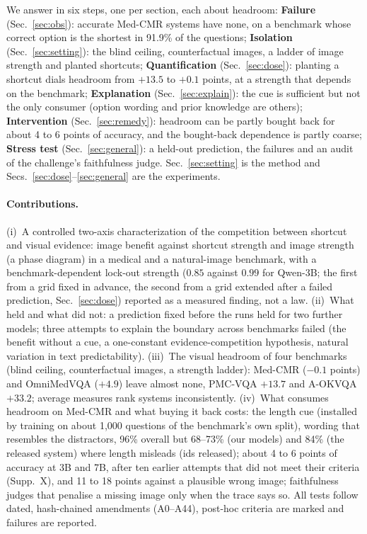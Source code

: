 We answer in six steps, one per section, each about headroom: \textbf{Failure} (Sec.~\ref{sec:obs}): accurate Med-CMR systems have none, on a benchmark whose correct option is the shortest in 91.9\% of the questions; \textbf{Isolation} (Sec.~\ref{sec:setting}): the blind ceiling, counterfactual images, a ladder of image strength and planted shortcuts; \textbf{Quantification} (Sec.~\ref{sec:dose}): planting a shortcut dials headroom from $+13.5$ to $+0.1$ points, at a strength that depends on the benchmark; \textbf{Explanation} (Sec.~\ref{sec:explain}): the cue is sufficient but not the only consumer (option wording and prior knowledge are others); \textbf{Intervention} (Sec.~\ref{sec:remedy}): headroom can be partly bought back for about 4 to 6 points of accuracy, and the bought-back dependence is partly coarse; \textbf{Stress test} (Sec.~\ref{sec:general}): a held-out prediction, the failures and an audit of the challenge's faithfulness judge.
Sec.~\ref{sec:setting} is the method and Secs.~\ref{sec:dose}--\ref{sec:general} are the experiments.

\paragraph{Contributions.}
(i)~A controlled two-axis characterization of the competition between shortcut and visual evidence: image benefit against shortcut strength and image strength (a phase diagram) in a medical and a natural-image benchmark, with a benchmark-dependent lock-out strength ($0.85$ against $0.99$ for Qwen-3B; the first from a grid fixed in advance, the second from a grid extended after a failed prediction, Sec.~\ref{sec:dose}) reported as a measured finding, not a law.
(ii)~What held and what did not: a prediction fixed before the runs held for two further models; three attempts to explain the boundary across benchmarks failed (the benefit without a cue, a one-constant evidence-competition hypothesis, natural variation in text predictability).
(iii)~The visual headroom of four benchmarks (blind ceiling, counterfactual images, a strength ladder): Med-CMR ($-0.1$ points) and OmniMedVQA ($+4.9$) leave almost none, PMC-VQA $+13.7$ and A-OKVQA $+33.2$; average measures rank systems inconsistently.
(iv)~What consumes headroom on Med-CMR and what buying it back costs: the length cue (installed by training on about 1{,}000 questions of the benchmark's own split), wording that resembles the distractors, 96\% overall but 68--73\% (our models) and 84\% (the released system) where length misleads (ids released); about 4 to 6 points of accuracy at 3B and 7B, after ten earlier attempts that did not meet their criteria (Supp.~X), and 11 to 18 points against a plausible wrong image; faithfulness judges that penalise a missing image only when the trace says so.
All tests follow dated, hash-chained amendments (A0--A44), post-hoc criteria are marked and failures are reported.
